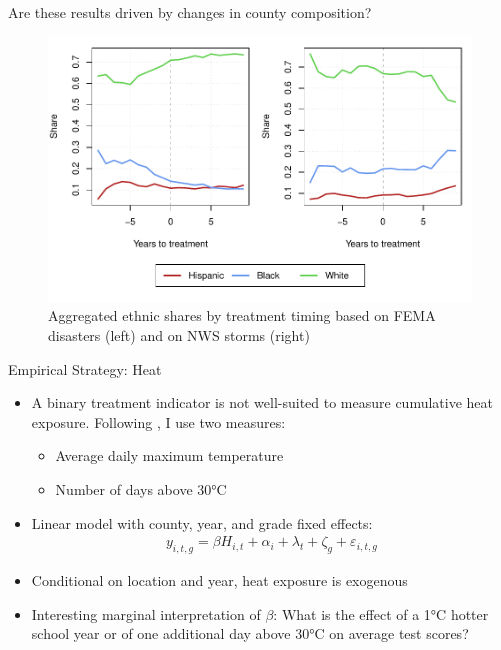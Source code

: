 \documentclass[hyperref={colorlinks = true,linkcolor = blue, citecolor=blue,urlcolor=blue}]{beamer}
\begin{document}
\begin{frame}{Are these results driven by changes in county composition?}
	\begin{figure}[!h]
		\centering
		\includegraphics[scale=0.6]{"../Code & Data/EthnicComposition.pdf"}
		\caption{Aggregated ethnic shares by treatment timing based on FEMA disasters (left) and on NWS storms (right)}
		\label{EthnicComposition}
	\end{figure}
\end{frame}

\begin{frame}{Empirical Strategy: Heat}
	\begin{itemize}
		\item A binary treatment indicator is not well-suited to measure cumulative heat exposure. Following \cite{Goodman_2020}, I use two measures:
		\begin{itemize}
			\item Average daily maximum temperature
			\item Number of days above 30°C
		\end{itemize}
		\item Linear model with county, year, and grade fixed effects:
		\begin{align*}
			y_{i, t, g} = \beta H_{i, t} + \alpha_i + \lambda_t + \zeta_g + \varepsilon_{i, t, g}
		\end{align*}
		\item Conditional on location and year, heat exposure is exogenous
		\item Interesting marginal interpretation of $\beta$: What is the effect of a 1°C hotter school year or of one additional	day above 30°C on average test scores?
	\end{itemize}
\end{frame}
\end{document}
